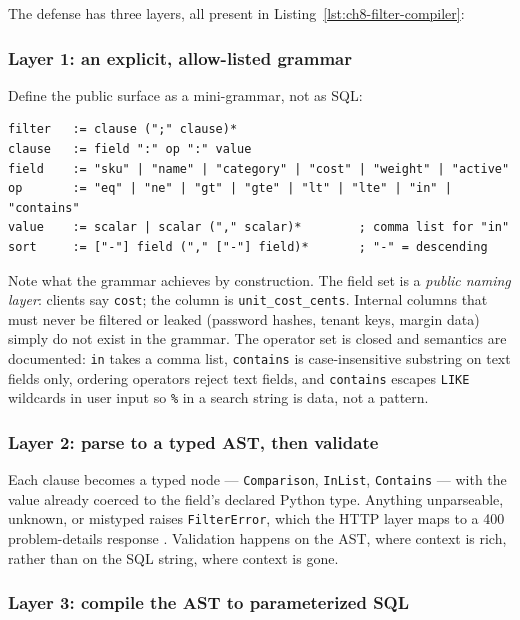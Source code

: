 The defense has three layers, all present in
Listing~\ref{lst:ch8-filter-compiler}:

\subsubsection{Layer 1: an explicit, allow-listed grammar}

Define the public surface as a mini-grammar, not as SQL:

\begin{verbatim}
filter   := clause (";" clause)*
clause   := field ":" op ":" value
field    := "sku" | "name" | "category" | "cost" | "weight" | "active"
op       := "eq" | "ne" | "gt" | "gte" | "lt" | "lte" | "in" | "contains"
value    := scalar | scalar ("," scalar)*        ; comma list for "in"
sort     := ["-"] field ("," ["-"] field)*       ; "-" = descending
\end{verbatim}

Note what the grammar achieves by construction. The field set is a
\emph{public naming layer}: clients say \texttt{cost}; the column is
\texttt{unit\_cost\_cents}. Internal columns that must never be filtered or
leaked (password hashes, tenant keys, margin data) simply do not exist in
the grammar. The operator set is closed and semantics are documented:
\texttt{in} takes a comma list, \texttt{contains} is case-insensitive
substring on text fields only, ordering operators reject text fields, and
\texttt{contains} escapes \texttt{LIKE} wildcards in user input so
\texttt{\%} in a search string is data, not a pattern.

\subsubsection{Layer 2: parse to a typed AST, then validate}

Each clause becomes a typed node --- \texttt{Comparison},
\texttt{InList}, \texttt{Contains} --- with the value already coerced to the
field's declared Python type. Anything unparseable, unknown, or mistyped
raises \texttt{FilterError}, which the HTTP layer maps to a 400
problem-details response \cite{rfc9110}. Validation happens on the AST,
where context is rich, rather than on the SQL string, where context is gone.

\subsubsection{Layer 3: compile the AST to parameterized SQL}

